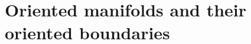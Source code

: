     

    
    
    


    
    
    
    

\newpage

\section{Oriented manifolds and their oriented boundaries}

